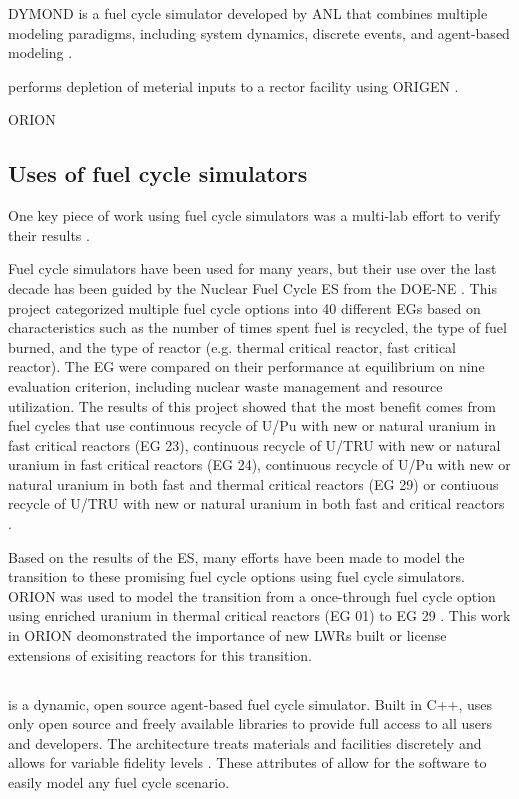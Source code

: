 \gls{DYMOND} is a fuel cycle simulator developed by \gls{ANL} that combines 
multiple modeling paradigms, including system dynamics, discrete events, and
agent-based modeling \cite{feng_sensitivity_2020}.

performs depletion of meterial inputs to a rector facility using 
ORIGEN \cite{wieselquist_scale_2020}.

ORION 

\subsection{Uses of fuel cycle simulators}
One key piece of work using fuel cycle simulators was a multi-lab effort 
to verify their results \cite{feng_standardized_2016}.

Fuel cycle simulators have been used for many years, but their use over the 
last decade has been guided by the Nuclear Fuel Cycle \gls{ES} from the \gls{DOE-NE} 
\cite{wigeland_nuclear_2014}. This project categorized 
multiple fuel cycle options into 40 different \glspl{EG} based on characteristics 
such as the number of times spent fuel is recycled, the type of fuel burned, 
and the type of reactor (e.g. thermal critical reactor, fast critical reactor). 
The \gls{EG} were compared on their performance at equilibrium on nine evaluation 
criterion, including nuclear waste management and resource utilization. The 
results of this project showed that the most benefit comes from fuel cycles 
that use continuous recycle of U/Pu with new or natural uranium in fast critical 
reactors (\gls{EG} 23), continuous recycle of U/TRU with new or natural 
uranium in fast critical reactors (\gls{EG} 24), continuous recycle of U/Pu 
with new or natural uranium in both fast and thermal critical reactors 
(\gls{EG} 29) or contiuous recycle of U/TRU with new or natural uranium in 
both fast and critical reactors \cite{wigeland_nuclear_2014}. 

Based on the results of the \gls{ES}, many efforts have been made to model 
the transition to these promising fuel cycle options using fuel cycle 
simulators. ORION was used to model the transition from a once-through 
fuel cycle option using enriched uranium in thermal critical reactors (\gls{EG}
01) to \gls{EG} 29 \cite{sunny_transition_2015}. This work in ORION 
deomonstrated the importance of new \glspl{LWR} built or license extensions of 
exisiting reactors for this transition. 


\subsection{\Cyclus}
\Cyclus is a dynamic, open source agent-based fuel cycle simulator. Built 
in C++, \Cyclus uses only open source and freely available libraries to 
provide full access to all users and developers. The 
\Cyclus architecture treats materials and facilities discretely and allows 
for variable fidelity levels \cite{huff_fundamental_2016}. These attributes
of \Cyclus allow for the software to easily model any fuel cycle scenario.

